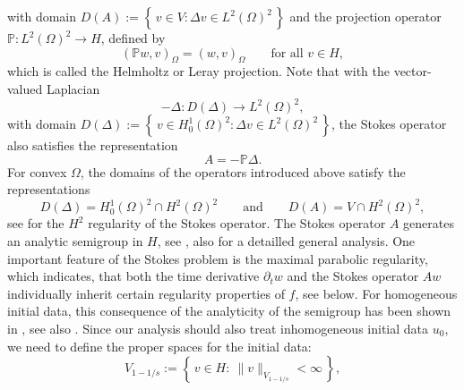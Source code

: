 \documentclass{m2an}
\newcommand{\Oprod}[1]{\left( #1 \right)_{\Omega}}
\newcommand{\MathSet}[1]{\left\lbrace \, #1 \, \right\rbrace}
\begin{document}
with domain $D(A) := \MathSet{v \in V : \Delta v \in L^2(\Omega)^2}$ and the
projection operator \mbox{$\mathbb P:L^2(\Omega)^2 \to H$}, defined by
\begin{equation*}
  \Oprod{\mathbb P w,v} = \Oprod{w,v} \qquad \text{for all } v \in H,
\end{equation*}
which is called the Helmholtz or Leray projection. 
Note that with the vector-valued Laplacian
\begin{equation*}
  - \Delta\colon D(\Delta) \to L^2(\Omega)^2,
\end{equation*}
with domain $D(\Delta) := \MathSet{v \in H^1_0(\Omega)^2 : \Delta v \in L^2(\Omega)^2}$, the Stokes operator
also satisfies the representation
\begin{equation*}
  A = - \mathbb P \Delta.
\end{equation*}
For convex $\Omega$, the domains of the operators introduced above satisfy the representations
\begin{equation*}
  D(\Delta) = H^1_0(\Omega)^2 \cap H^2(\Omega)^2 \qquad \text{and}\qquad
  D(A) = V \cap H^2(\Omega)^2,
\end{equation*}
see \cite{Dauge1989} for the $H^2$ regularity of the Stokes operator.
The Stokes operator $A$ generates an analytic semigroup in $H$,
see \cite{behringer_fully_2022,lunardi_analytic_2012}, also
\cite{ashyralyev_well_posedness_1994} for a detailled general analysis.
One important feature of the Stokes problem is the
maximal parabolic regularity, which
indicates, that both the time derivative $\partial_t w$ and the Stokes operator
$A w$ individually inherit certain regularity properties of $f$, see  below. 
For homogeneous initial data, this consequence of the analyticity of the semigroup has been shown in
\cite{de_simon_applicazione_1964}, see also \cite[Chapter IV, Theorem 1.6.3]{Sohr2001}. Since our analysis
should also treat inhomogeneous initial data $u_0$, we need to define the proper spaces for the initial
data: 
\begin{equation*}
  V_{1-1/s} := \MathSet{ v \in H : \ \|v\|_{V_{1-1/s}} < \infty },
\end{equation*}
\end{document}
